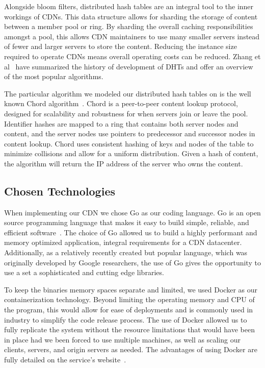 \documentclass[conference]{IEEEtran}
\begin{document}
Alongside bloom filters, distributed hash tables are an integral tool to the inner workings of CDNs.  This data structure allows for sharding the storage of content between a member pool or ring.  By sharding the overall caching responsibilities amongst a pool, this allows CDN maintainers to use many smaller servers instead of fewer and larger servers to store the content.  Reducing the instance size required to operate CDNs means overall operating costs can be reduced. Zhang et al~\cite{ZhangDHT} have summarized the history of development of DHTs and offer an overview of the most popular algorithms. 

The particular algorithm we modeled our distributed hash tables on is the well known Chord algorithm~\cite{StoicaChord}. Chord is a peer-to-peer content lookup protocol, designed for scalability and robustness for when servers join or leave the pool. Identifier hashes are mapped to a ring that contains both server nodes and content, and the server nodes use pointers to predecessor and successor nodes in content lookup. Chord uses consistent hashing of keys and nodes of the table to minimize collisions and allow for a uniform distribution. Given a hash of content, the algorithm will return the IP address of the server who owns the content. 

\subsection*{Chosen Technologies}
When implementing our CDN we chose Go as our coding language.  Go is an open source programming language that makes it easy to build simple, reliable, and efficient software~\cite{go}.  The choice of Go allowed us to build a highly performant and memory optimized application, integral requirements for a CDN datacenter. Additionally, as a relatively recently created but popular language, which was originally developed by Google researchers, the use of Go gives the opportunity to use a set a sophisticated and cutting edge libraries.

To keep the binaries memory spaces separate and limited, we used Docker as our containerization technology.  Beyond limiting the operating memory and CPU of the program, this would allow for ease of deployments and is commonly used in industry to simplify the code release process. The use of Docker allowed us to fully replicate the system without the resource limitations that would have been in place had we been forced to use multiple machines, as well as scaling our clients, servers, and origin servers as needed. The advantages of using Docker are fully detailed on the service’s website~\cite{docker}. 
\end{document}

